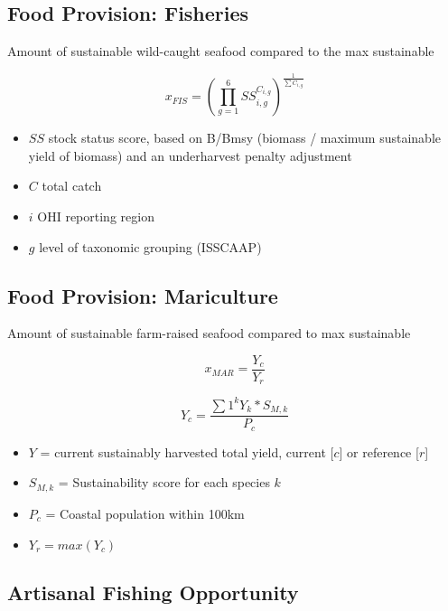 \documentclass[
]{article}
\author{}
\date{\vspace{-2.5em}}
\begin{document}
\hypertarget{food-provision-fisheries}{%
\subsection{Food Provision: Fisheries}\label{food-provision-fisheries}}

Amount of sustainable wild-caught seafood compared to the max
sustainable

\[
x_{FIS} =  (\prod_{g=1}^{6} SS_{i,g}^{C_{i,g}})^\frac{1}{\sum{C_{i,g}}}
\]

\begin{itemize}
\item
  \(SS\) stock status score, based on B/Bmsy (biomass / maximum
  sustainable yield of biomass) and an underharvest penalty adjustment
\item
  \(C\) total catch
\item
  \(i\) OHI reporting region
\item
  \(g\) level of taxonomic grouping (ISSCAAP)
\end{itemize}

\hypertarget{food-provision-mariculture}{%
\subsection{Food Provision:
Mariculture}\label{food-provision-mariculture}}

Amount of sustainable farm-raised seafood compared to max sustainable

\[
x_{MAR} =  \frac{Y_{c}}{Y_{r}}
\]

\[
Y_{c} = \frac{\sum{1}^{k} Y_{k} * S_{M,k}}{P_{c}}
\]

\begin{itemize}
\item
  \(Y\) = current sustainably harvested total yield, current {[}\(c\){]}
  or reference {[}\(r\){]}
\item
  \(S_{M,k}\) = Sustainability score for each species \(k\)
\item
  \(P_{c}\) = Coastal population within 100km
\item
  \(Y_{r} = max(Y_{c})\)
\end{itemize}

\hypertarget{artisanal-fishing-opportunity}{%
\subsection{Artisanal Fishing
Opportunity}\label{artisanal-fishing-opportunity}}
\end{document}
